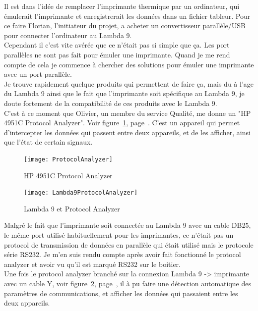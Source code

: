 \documentclass[12pt]{article}
\begin{document}
Il est dans l'idée de remplacer l'imprimante thermique par un ordinateur, qui émulerait l'imprimante et enregistrerait les données dans un fichier tableur.
Pour ce faire Florian, l'initiateur du projet, a acheter un convertisseur parallèle/USB pour connecter l'ordinateur au Lambda 9.\\
Cependant il c'est vite avérée que ce n'était pas si simple que ça.
Les port parallèles ne sont pas fait pour émuler une imprimante.
Quand je me rend compte de cela je commence à chercher des solutions pour émuler une imprimante avec un port parallèle.\\
Je trouve rapidement quelque produits qui permettent de faire ça, mais du à l'age du Lambda 9 ainsi que le fait que l'imprimante soit spécifique au Lambda 9, je doute fortement de la compatibilité de ces produits avec le Lambda 9.\\
C'est à ce moment que Olivier, un membre du service Qualité, me donne un "HP 4951C Protocol Analyzer".
Voir figure~\ref{fig:protocolAnalyzer}, page~\pageref{fig:protocolAnalyzer}.
C'est un appareil qui permet d'intercepter les données qui passent entre deux appareils, et de les afficher, ainsi que l'état de certain signaux.\\
\begin{figure}[H]
	\centering
	\texttt{[image: ProtocolAnalyzer]}
	\caption{HP 4951C Protocol Analyzer}
	\label{fig:protocolAnalyzer}
\end{figure}
\begin{figure}[H]
	\centering
	\texttt{[image: Lambda9ProtocolAnalyzer]}
	\caption{Lambda 9 et Protocol Analyzer}
	\label{fig:lambda9HP}
\end{figure}
Malgré le fait que l'imprimante soit connectée au Lambda 9 avec un cable DB25, le même port utilisé habituellement pour les imprimantes, ce n'était pas un protocol de transmission de données en parallèle qui était utilisé mais le protocole série RS232.
Je m'en suis rendu compte après avoir fait fonctionné le protocol analyzer et avoir vu qu'il est marqué RS232 sur le boitier.\\
Une fois le protocol analyzer branché sur la connexion Lambda 9 -> imprimante avec un cable Y, voir figure~\ref{fig:lambda9HP}, page~\pageref{fig:lambda9HP}, il à pu faire une détection automatique des paramètres de communications, et afficher les données qui passaient entre les deux appareils.
\end{document}
